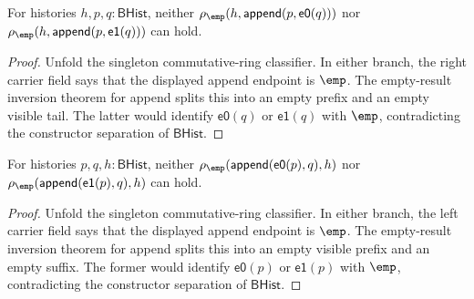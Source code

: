 \begin{theorem}
\label{thm:commring-singleton-classifier-append-visible-right-absurd}
For histories $h,p,q:\mathsf{BHist}$, neither
$\rho_{\emp}(h,\mathsf{append}(p,\mathsf{e0}(q)))$ nor
$\rho_{\emp}(h,\mathsf{append}(p,\mathsf{e1}(q)))$ can hold.
\end{theorem}
\begin{proof}
Unfold the singleton commutative-ring classifier. In either branch, the right
carrier field says that the displayed append endpoint is $\emp$. The
empty-result inversion theorem for append splits this into an empty prefix and
an empty visible tail. The latter would identify $\mathsf{e0}(q)$ or
$\mathsf{e1}(q)$ with $\emp$, contradicting the constructor separation of
$\mathsf{BHist}$.
\end{proof}

\begin{theorem}
\label{thm:commring-singleton-classifier-append-visible-prefix-absurd}
For histories $p,q,h:\mathsf{BHist}$, neither
$\rho_{\emp}(\mathsf{append}(\mathsf{e0}(p),q),h)$ nor
$\rho_{\emp}(\mathsf{append}(\mathsf{e1}(p),q),h)$ can hold.
\end{theorem}
\begin{proof}
Unfold the singleton commutative-ring classifier. In either branch, the left
carrier field says that the displayed append endpoint is $\emp$. The
empty-result inversion theorem for append splits this into an empty visible
prefix and an empty suffix. The former would identify $\mathsf{e0}(p)$ or
$\mathsf{e1}(p)$ with $\emp$, contradicting the constructor separation of
$\mathsf{BHist}$.
\end{proof}

